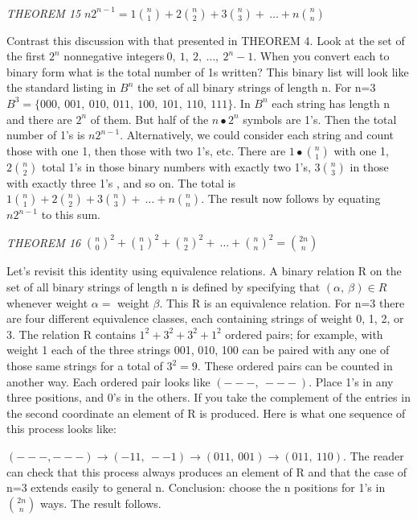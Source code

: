 \emph{\\
THEOREM 15} \(n2^{n - 1} = 1
\binom{n}{1}
 + 2
\binom{n}{2}
 + 3
\binom{n}{3}
 + \ \ldots + n
\binom{n}{n}
\)

Contrast this discussion with that presented in THEOREM 4. Look at the
set of the first \(2^{n}\) nonnegative
integers\(\ 0,\ 1,\ 2,\ \ldots,\ 2^{n} - 1\). When you convert each to
binary form what is the total number of 1s written? This binary list
will look like the standard listing in \(B^{n}\) the set of all binary
strings of length n. For n=3
\(B^{3} = \{ 000,\ 001,\ 010,\ 011,\ 100,\ 101,\ 110,\ 111\}\). In
\(B^{n}\) each string has length n and there are \(2^{n}\) of them. But
half of the \(n \bullet 2^{n}\) symbols are 1's. Then the total number
of 1's is \(n2^{n - 1}\). Alternatively, we could consider each string
and count those with one 1, then those with two 1's, etc. There are
\(1 \bullet
\binom{n}{1}
\) with one 1, \(2
\binom{n}{2}
\) total 1's in those binary numbers with exactly two 1's,
\(3
\binom{n}{3}
\) in those with exactly three 1's , and so on. The total
is \(1
\binom{n}{1}
 + 2
\binom{n}{2}
 + 3
\binom{n}{3}
 + \ \ldots + n
\binom{n}{n}
\text{.\ }\)The result now follows by equating
\(n2^{n - 1}\) to this sum.

\emph{THEOREM 16} \(\binom{n}{0}
^{2} +
\binom{n}{1}
^{2} +
\binom{n}{2}
^{2} + \ \ldots +
\binom{n}{n}
^{2} =
\binom{2n}{n}
\)

Let's revisit this identity using equivalence relations. A binary
relation R on the set of all binary strings of length n is defined by
specifying that \(\left( \alpha,\ \beta \right) \in R\) whenever weight
\(\alpha =\) weight \(\beta\). This R is an equivalence relation. For
n=3 there are four different equivalence classes, each containing
strings of weight 0, 1, 2, or 3. The relation R contains
\(1^{2} + 3^{2} + 3^{2} + 1^{2}\) ordered pairs; for example, with
weight 1 each of the three strings 001, 010, 100 can be paired with any
one of those same strings for a total of \(3^{2} = 9\). These ordered
pairs can be counted in another way. Each ordered pair looks like
\(\left( - - - ,\  - - - \right).\) Place 1's in any three positions,
and 0's in the others. If you take the complement of the entries in the
second coordinate an element of R is produced. Here is what one sequence
of this process looks like:

\(\left( - - - , - - - \right) \rightarrow \left( - 11,\  - - 1 \right) \rightarrow \left( 011,\ 001 \right) \rightarrow (011,\ 110)\).
The reader can check that this process always produces an element of R
and that the case of n=3 extends easily to general n. Conclusion: choose
the n positions for 1's in \(\binom{2n}{n}
\) ways. The result follows.

